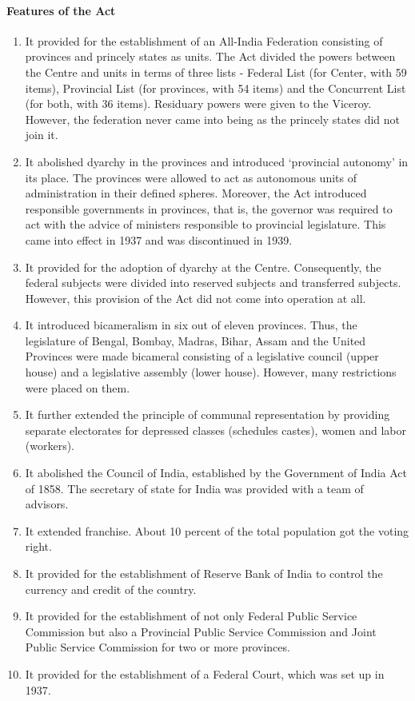 \begin{multicol}{2}
\paragraph{Features of the Act}
\begin{enumerate}
  \item It provided for the establishment of an All-India Federation consisting of provinces and princely states as units. The Act divided the powers between the Centre and units in terms of three lists - Federal List (for Center, with 59 items), Provincial List (for provinces, with 54 items) and the Concurrent List (for both, with 36 items). Residuary powers were given to the Viceroy. However, the federation never came into being as the princely states did not join it.
  \item It abolished dyarchy in the provinces and introduced `provincial autonomy' in its place. The provinces were allowed to act as autonomous units of administration in their defined spheres. Moreover, the Act introduced responsible governments in provinces, that is, the governor was required to act with the advice of ministers responsible to provincial legislature. This came into effect in 1937 and was discontinued in 1939.
  \item It provided for the adoption of dyarchy at the Centre. Consequently, the federal subjects were divided into reserved subjects and transferred subjects. However, this provision of the Act did not come into operation at all.
  \item It introduced bicameralism in six out of eleven provinces. Thus, the legislature of Bengal, Bombay, Madras, Bihar, Assam and the United Provinces were made bicameral consisting of a legislative council (upper house) and a legislative assembly (lower house). However, many restrictions were placed on them.
  \item It further extended the principle of communal representation by providing separate electorates for depressed classes (schedules castes), women and labor (workers).
  \item It abolished the Council of India, established by the Government of India Act of 1858. The secretary of state for India was provided with a team of advisors.
  \item It extended franchise. About 10 percent of the total population got the voting right.
  \item It provided for the establishment of Reserve Bank of India to control the currency and credit of the country.
  \item It provided for the establishment of not only Federal Public Service Commission but also a Provincial Public Service Commission and Joint Public Service Commission for two or more provinces.
  \item It provided for the establishment of a Federal Court, which was set up in 1937.
\end{enumerate}



\end{multicol}
